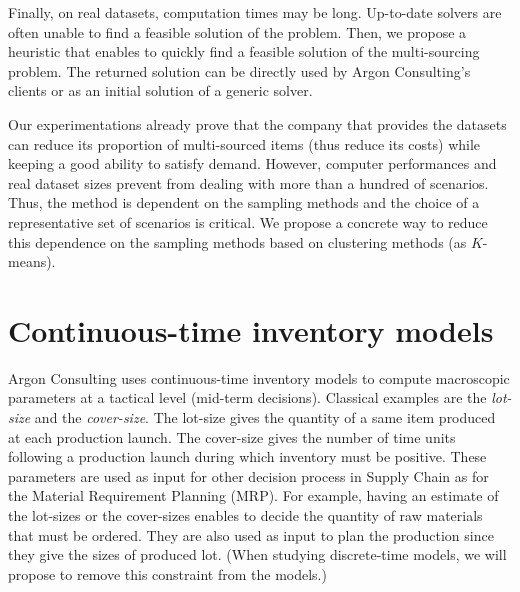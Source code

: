\medskip


Finally, on real datasets, computation times may be long.
Up-to-date solvers are often unable to find a feasible solution of the problem.
Then, we propose a heuristic that enables to quickly find a feasible solution of the multi-sourcing problem.
The returned solution can be directly used by Argon Consulting's clients or as an initial solution of a generic solver.


\medskip


Our experimentations already prove that the company that provides the datasets can reduce its proportion of multi-sourced items (thus reduce its costs) while keeping a good ability to satisfy demand.
However, computer performances and real dataset sizes prevent from dealing with more than a hundred of scenarios.
Thus, the method is dependent on the sampling methods and the choice of a representative set of scenarios is critical.
We propose a concrete way to reduce this dependence on the sampling methods based on clustering methods (as $K$-means).


\section{Continuous-time inventory models}
\label{sec:intro:en:continuous-time-inventory-models}


Argon Consulting uses continuous-time inventory models to compute macroscopic parameters at a tactical level (mid-term decisions).
Classical examples are the \emph{lot-size} and the \emph{cover-size}.
The lot-size gives the quantity of a same item produced at each production launch.
The cover-size gives the number of time units following a production launch during which inventory must be positive.
These parameters are used as input for other decision process in Supply Chain as for the Material Requirement Planning (MRP).
For example, having an estimate of the lot-sizes or the cover-sizes enables to decide the quantity of raw materials that must be ordered.
They are also used as input to plan the production since they give the sizes of produced lot.
(When studying discrete-time models, we will propose to remove this constraint from the models.)


